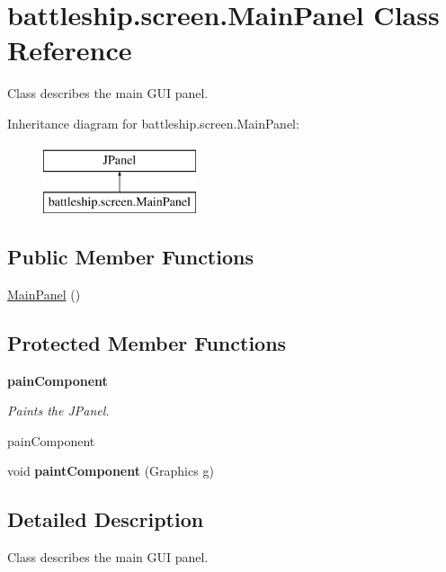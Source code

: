 \hypertarget{classbattleship_1_1screen_1_1MainPanel}{}\section{battleship.\+screen.\+Main\+Panel Class Reference}
\label{classbattleship_1_1screen_1_1MainPanel}


Class describes the main G\+U\+I panel.  


Inheritance diagram for battleship.\+screen.\+Main\+Panel\+:\begin{figure}[H]
\begin{center}
\leavevmode
\includegraphics[height=2.000000cm]{classbattleship_1_1screen_1_1MainPanel}
\end{center}
\end{figure}
\subsection*{Public Member Functions}
\begin{DoxyCompactItemize}
\item 
\hyperlink{classbattleship_1_1screen_1_1MainPanel_affd53c582b468bb0f6dcc91460046bab}{Main\+Panel} ()
\end{DoxyCompactItemize}
\subsection*{Protected Member Functions}
\begin{Indent}{\bf pain\+Component}\par
{\em Paints the J\+Panel.

pain\+Component }\begin{DoxyCompactItemize}
\item 
\hypertarget{classbattleship_1_1screen_1_1MainPanel_a128cd3f41c9e17999356cf08d817b033}{}void {\bfseries paint\+Component} (Graphics g)\label{classbattleship_1_1screen_1_1MainPanel_a128cd3f41c9e17999356cf08d817b033}

\end{DoxyCompactItemize}
\end{Indent}


\subsection{Detailed Description}
Class describes the main G\+U\+I panel. 

